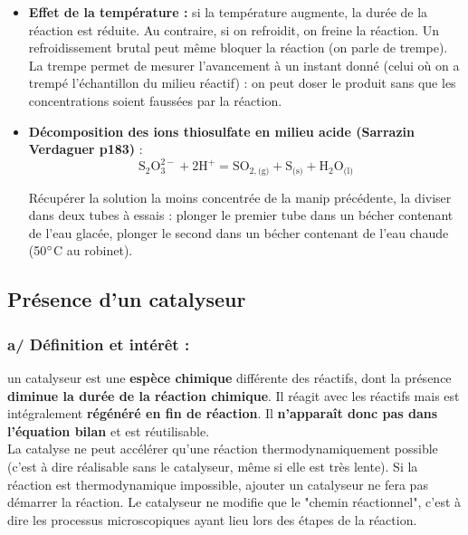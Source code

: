 \documentclass[11pt,a4paper]{report}
\begin{document}
\begin{itemize}
	\item \textbf{Effet de la température :} si la température augmente, la durée de la 			réaction est réduite. Au contraire, si on refroidit, on freine la réaction. Un refroidissement brutal peut même bloquer la réaction (on parle de trempe). La trempe permet de mesurer l'avancement à un instant donné (celui où on a trempé l'échantillon du milieu réactif) : on peut doser le produit sans que les concentrations soient faussées par la réaction.\\
	
	\item \textbf{Décomposition des ions thiosulfate en milieu acide (Sarrazin Verdaguer p183)} :
	\begin{equation}
		\boxed{\text{S}_2\text{O}_3^{2-} + 2\text{H}^+ 
		= \text{SO}_{2,\text{(g)}} + \text{S}_\text{(s)} + \text{H}_2\text{O}_\text{(l)}}
	\end{equation}
	
	Récupérer la solution la moins concentrée de la manip précédente, la diviser dans deux tubes à 	essais : plonger le premier tube dans un bécher contenant de l'eau glacée, plonger le second dans 	un bécher contenant de l'eau chaude (50$\degree$C au robinet).
\end{itemize}

\subsection{Présence d'un catalyseur}

\subsubsection*{a/ Définition et intérêt :} un catalyseur est une \textbf{espèce chimique} différente des réactifs, dont la présence \textbf{diminue la durée de la réaction chimique}. Il réagit avec les réactifs mais est intégralement \textbf{régénéré en fin de réaction}. Il \textbf{n'apparaît donc pas dans l'équation bilan} et est réutilisable.\\

La catalyse ne peut accélérer qu'une réaction thermodynamiquement possible (c'est à dire réalisable sans le catalyseur, même si elle est très lente). Si la réaction est thermodynamique impossible, ajouter un catalyseur ne fera pas démarrer la réaction. Le catalyseur ne modifie que le "chemin réactionnel", c'est à dire les processus microscopiques ayant lieu lors des étapes de la réaction.
			
\end{document}
